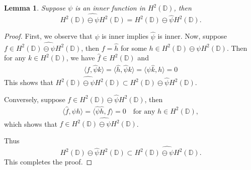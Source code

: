 \documentclass[11pt]{amsart}
\newtheorem{lemma}[theorem]{Lemma}
\numberwithin{equation}{section}
\begin{document}
\begin{lemma}\label{Lem2}
Suppose $\psi$ is an inner function in $H^2(\mathbb{D})$, then $$\widehat{H^2(\mathbb{D})\ominus \psi
H^2(\mathbb{D})}=H^2(\mathbb{D}) \ominus \widehat{\psi} H^2(\mathbb{D}).$$
\end{lemma}
\begin{proof}
First, we observe that $\psi$ is inner implies $\widehat{\psi}$ is inner.
Now, suppose $f\in \widehat{H^2(\mathbb{D})\ominus \psi
H^2(\mathbb{D})}$, then $f=\widehat{h}$ for some $h \in H^2(\mathbb{D})\ominus \psi H^2(\mathbb{D})$. Then for any $k \in H^2(\mathbb{D})$, we have $\widehat{f}\in H^2(\mathbb{D})$ and
\begin{eqnarray*}
\langle f, \widehat{\psi} k \rangle=
\langle \widehat{h}, \widehat{\psi} k \rangle= \langle \psi \widehat{k}, h \rangle=0 
\end{eqnarray*}
This shows that $\widehat{H^2(\mathbb{D})\ominus \psi
H^2(\mathbb{D})} \subset H^2(\mathbb{D}) \ominus \widehat{\psi} H^2(\mathbb{D})$.


 Conversely, suppose $f \in H^2(\mathbb{D}) \ominus \widehat{\psi} H^2(\mathbb{D})$, then
\begin{eqnarray*}
\langle \widehat{f}, \psi h \rangle=\langle \widehat{\psi} \widehat{h}, f \rangle=0    \text{  }   \text{ for any } h \in H^2(\mathbb{D}),  
\end{eqnarray*}
which shows that $f\in \widehat{H^2(\mathbb{D})\ominus \psi H^2(\mathbb{D})}$.

Thus $$H^2(\mathbb{D}) \ominus \widehat{\psi} H^2(\mathbb{D})\subset \widehat{H^2(\mathbb{D})\ominus \psi H^2(\mathbb{D})}.$$ This completes the proof.
\end{proof}
\end{document}
